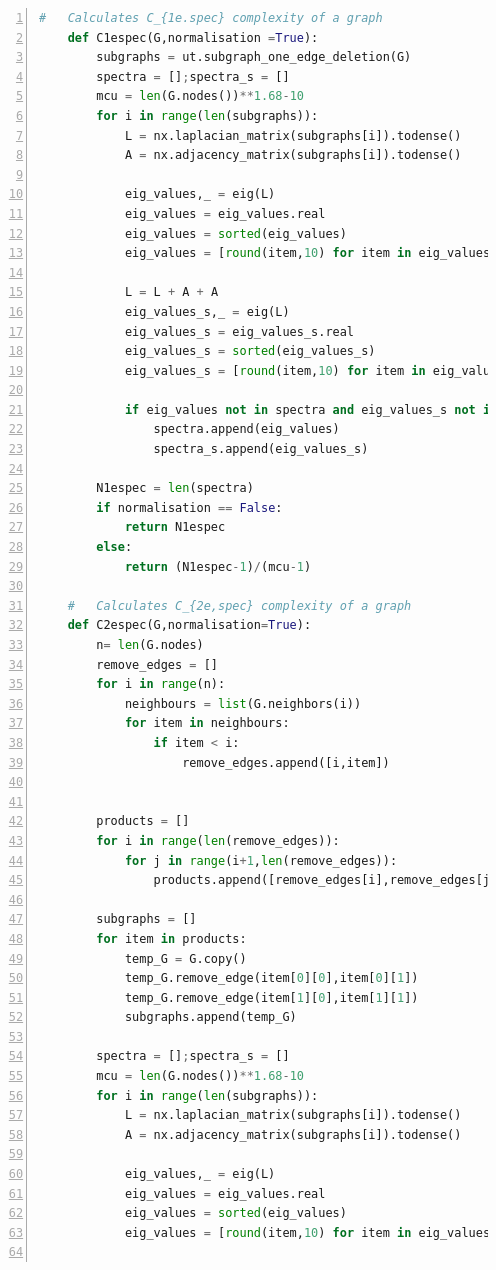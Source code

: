 \documentclass[12pt]{article}
\begin{document}
\begin{lstlisting}[numbers=left,language=Python,breaklines=true]
    #   Calculates C_{1e.spec} complexity of a graph
    def C1espec(G,normalisation =True):
        subgraphs = ut.subgraph_one_edge_deletion(G)
        spectra = [];spectra_s = []
        mcu = len(G.nodes())**1.68-10
        for i in range(len(subgraphs)):
            L = nx.laplacian_matrix(subgraphs[i]).todense()
            A = nx.adjacency_matrix(subgraphs[i]).todense()
            
            eig_values,_ = eig(L)
            eig_values = eig_values.real
            eig_values = sorted(eig_values)
            eig_values = [round(item,10) for item in eig_values]
            
            L = L + A + A
            eig_values_s,_ = eig(L)
            eig_values_s = eig_values_s.real
            eig_values_s = sorted(eig_values_s)
            eig_values_s = [round(item,10) for item in eig_values_s]
            
            if eig_values not in spectra and eig_values_s not in spectra_s:
                spectra.append(eig_values)
                spectra_s.append(eig_values_s)
            
        N1espec = len(spectra)
        if normalisation == False:
            return N1espec
        else:
            return (N1espec-1)/(mcu-1)
    
    #   Calculates C_{2e,spec} complexity of a graph
    def C2espec(G,normalisation=True):
        n= len(G.nodes)
        remove_edges = []
        for i in range(n):
            neighbours = list(G.neighbors(i))
            for item in neighbours:
                if item < i:
                    remove_edges.append([i,item])
        
        
        products = []
        for i in range(len(remove_edges)):
            for j in range(i+1,len(remove_edges)):
                products.append([remove_edges[i],remove_edges[j]])
        
        subgraphs = []
        for item in products:
            temp_G = G.copy()
            temp_G.remove_edge(item[0][0],item[0][1])
            temp_G.remove_edge(item[1][0],item[1][1])
            subgraphs.append(temp_G)
            
        spectra = [];spectra_s = []
        mcu = len(G.nodes())**1.68-10
        for i in range(len(subgraphs)):
            L = nx.laplacian_matrix(subgraphs[i]).todense()
            A = nx.adjacency_matrix(subgraphs[i]).todense()
            
            eig_values,_ = eig(L)
            eig_values = eig_values.real
            eig_values = sorted(eig_values)
            eig_values = [round(item,10) for item in eig_values]
            

\end{lstlisting}
\end{document}
